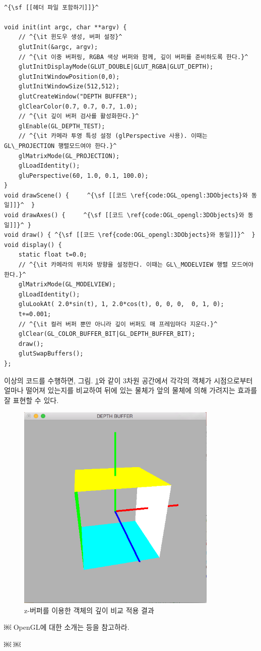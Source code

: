 \begin{algorithmbis}\label{code:OGL_opengl:3DObjectsWithZbuff}
\lstset{language=C++, escapechar=^} 
\begin{lstlisting}

^{\sf [[헤더 파일 포함하기]]}^

void init(int argc, char **argv) {
    // ^{\it 윈도우 생성, 버퍼 설정}^
    glutInit(&argc, argv);
    // ^{\it 이중 버퍼링, RGBA 색상 버퍼와 함께, 깊이 버퍼를 준비하도록 한다.}^
    glutInitDisplayMode(GLUT_DOUBLE|GLUT_RGBA|GLUT_DEPTH);
    glutInitWindowPosition(0,0);
    glutInitWindowSize(512,512);
    glutCreateWindow("DEPTH BUFFER");
    glClearColor(0.7, 0.7, 0.7, 1.0);
    // ^{\it 깊이 버퍼 검사를 활성화한다.}^
    glEnable(GL_DEPTH_TEST);
    // ^{\it 카메라 투영 특성 설정 (glPerspective 사용). 이때는 GL\_PROJECTION 행렬모드여야 한다.}^
    glMatrixMode(GL_PROJECTION);
    glLoadIdentity();
    gluPerspective(60, 1.0, 0.1, 100.0);
}
void drawScene() {     ^{\sf [[코드 \ref{code:OGL_opengl:3DObjects}와 동일]]}^  }
void drawAxes() {     ^{\sf [[코드 \ref{code:OGL_opengl:3DObjects}와 동일]]}^ }
void draw() { ^{\sf [[코드 \ref{code:OGL_opengl:3DObjects}와 동일]]}^  }
void display() {
    static float t=0.0;
    // ^{\it 카메라의 위치와 방향을 설정한다. 이때는 GL\_MODELVIEW 행렬 모드여야 한다.}^
    glMatrixMode(GL_MODELVIEW);
    glLoadIdentity();
    gluLookAt( 2.0*sin(t), 1, 2.0*cos(t), 0, 0, 0,  0, 1, 0);
    t+=0.001;
    // ^{\it 컬러 버퍼 뿐만 아니라 깊이 버퍼도 매 프레임마다 지운다.}^
    glClear(GL_COLOR_BUFFER_BIT|GL_DEPTH_BUFFER_BIT);
    draw();
    glutSwapBuffers();
};
\end{lstlisting}
\end{algorithmbis}

이상의 코드를 수행하면, 그림. \ref{fig:OGL_opengl:ZBuff}와 같이 3차원 공간에서 각각의 객체가 시점으로부터 얼마나 떨어져 있는지를 비교하여 뒤에 있는 물체가 앞의 물체에 의해 가려지는 효과를 잘 표현할 수 있다.

\begin{figure}[h!]
  \centering
    \includegraphics[height=10cm]{OGL_opengl/ZBuff.png}
    \caption{z-버퍼를 이용한 객체의 깊이 비교 적용 결과}
    \label{fig:OGL_opengl:ZBuff}
\end{figure}
 ￼
OpenGL에 대한 소개는 \cite{woo1999openGL,wright2004openGL} 등을 참고하라.

￼
￼